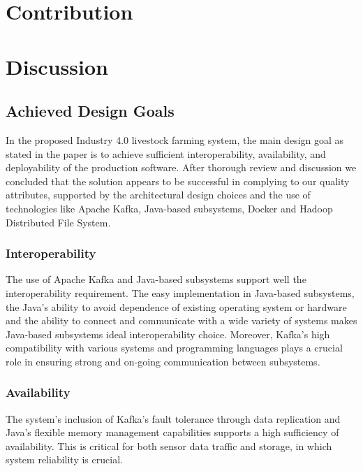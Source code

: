 \documentclass[conference]{IEEEtran}
\begin{document}
\maketitle
\IEEEpubidadjcol


\section{Contribution}



\section{Discussion}
\subsection{Achieved Design Goals}
In the proposed Industry 4.0 livestock farming system, the main design goal as stated in the paper is to achieve sufficient interoperability, availability, and deployability of the production software. After thorough review and discussion we concluded that the solution appears to be successful in complying to our quality attributes, supported by the architectural design choices and the use of technologies like Apache Kafka, Java-based subsystems, Docker and Hadoop Distributed File System.

\subsubsection{Interoperability}
The use of Apache Kafka and Java-based subsystems support well the interoperability requirement. The easy implementation in Java-based subsystems, the Java's ability to avoid dependence of existing operating system or hardware and the ability to connect and communicate with a wide variety of systems makes Java-based subsystems ideal interoperability choice. Moreover, Kafka's high compatibility with various systems and programming languages plays a crucial role in ensuring strong and on-going communication between subsystems.

\subsubsection{Availability}
The system's inclusion of Kafka’s fault tolerance through data replication and Java's flexible memory management capabilities supports a high sufficiency of availability. This is critical for both sensor data traffic and storage, in which system reliability is crucial.
\end{document}
